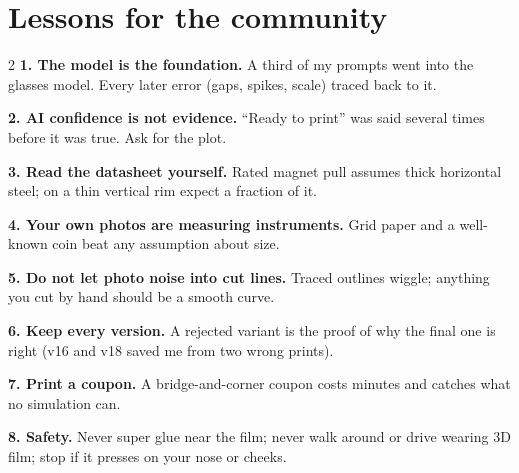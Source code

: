 \documentclass[10pt,a4paper,oneside]{article}
\begin{document}
\section{Lessons for the community}
\begin{multicols}{2}\small
\textbf{\sffamily\color{teal}1. The model is the foundation.} A third of my prompts went into the glasses model. Every later error (gaps, spikes, scale) traced back to it.

\textbf{\sffamily\color{teal}2. AI confidence is not evidence.} ``Ready to print'' was said several times before it was true. Ask for the plot.

\textbf{\sffamily\color{teal}3. Read the datasheet yourself.} Rated magnet pull assumes thick horizontal steel; on a thin vertical rim expect a fraction of it.

\textbf{\sffamily\color{teal}4. Your own photos are measuring instruments.} Grid paper and a well-known coin beat any assumption about size.

\textbf{\sffamily\color{teal}5. Do not let photo noise into cut lines.} Traced outlines wiggle; anything you cut by hand should be a smooth curve.

\textbf{\sffamily\color{teal}6. Keep every version.} A rejected variant is the proof of why the final one is right (v16 and v18 saved me from two wrong prints).

\textbf{\sffamily\color{teal}7. Print a coupon.} A bridge-and-corner coupon costs minutes and catches what no simulation can.

\textbf{\sffamily\color{coral}8. Safety.} Never super glue near the film; never walk around or drive wearing 3D film; stop if it presses on your nose or cheeks.
\end{multicols}
\end{document}
